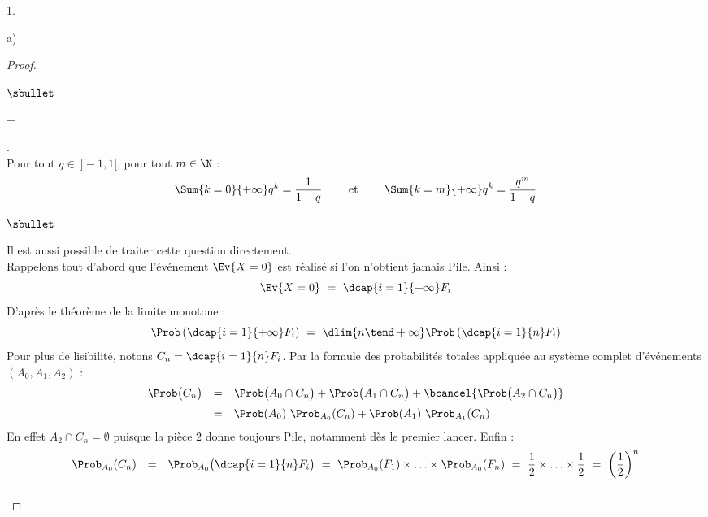 \documentclass[11pt]{article}%
\begin{document}
\begin{noliste}{1.}
\begin{noliste}{a)}
\begin{proof}
\begin{remarkL}{.98}
\begin{noliste}{$\sbullet$}
\begin{noliste}{$-$}
          \item {}.\\
            Pour tout $q \in \ ]-1, 1[$, pour tout $m \in \N$ :
            \[
            \Sum{k = 0}{+\infty} q^k = \dfrac{1}{1-q}%
            \qquad \text{ et } \qquad %
            \Sum{k = m}{+\infty} q^k = \dfrac{q^m}{1-q}
            \]
          \end{noliste}          
        \end{noliste}
      \end{remarkL}


      \newpage


      \begin{remarkL}{.98}%
        \begin{noliste}{$\sbullet$}
        \item Il est aussi possible de traiter cette question
          directement.\\
          Rappelons tout d'abord que l'événement $\Ev{X = 0}$ est
          réalisé si l'on n'obtient jamais Pile. Ainsi :
          \[
          \Ev{X = 0} \ = \ \dcap{i=1}{+\infty} F_i
          \]
          D'après le théorème de la limite monotone :
          \[
          \Prob\left(\dcap{i=1}{+\infty} F_i \right) \ = \ \dlim{n
            \tend +\infty} \Prob\left(\dcap{i=1}{n} F_i \right)
          \]
          Pour plus de lisibilité, notons $C_n = \dcap{i=1}{n} F_i$.
          Par la formule des probabilités totales appliquée au système
          complet d'événements $(A_0, A_1, A_2)$ :
          \[
          \begin{array}{rcl}
            \Prob\big( C_n \big) & = & \Prob\big( A_0 \cap C_n \big) +
            \Prob\big( A_1 \cap C_n \big) + \bcancel{\Prob\big( A_2 \cap
              C_n \big)}
            \\[.2cm]
            & = & \Prob(A_0) \ \Prob_{A_0}(C_n) + \Prob(A_1) \
            \Prob_{A_1}(C_n) 
          \end{array}
          \]
          En effet $A_2 \cap C_n = \emptyset$ puisque la pièce $2$
          donne toujours Pile, notamment dès le premier lancer. Enfin
          :
          \[
          \begin{array}{rcl}
            \Prob_{A_0}( C_n ) & = & \Prob_{A_0}\big( \dcap{i=1}{n} F_i
            \big) \ = \ \Prob_{A_0}(F_1) \times \ldots \times \Prob_{A_0}(F_n)
            \ = \ \dfrac{1}{2} \times \ldots \times \dfrac{1}{2} \ = \
            \left( \dfrac{1}{2} \right)^n
            \\[.4cm]

\end{array}\]
\end{noliste}
\end{remarkL}
\end{proof}
\end{noliste}
\end{noliste}
\end{document}
